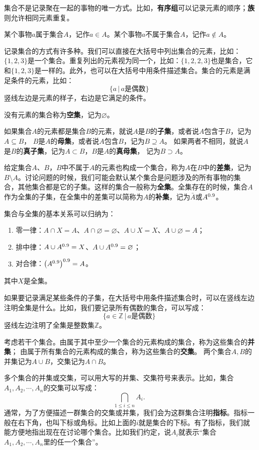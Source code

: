 \documentclass[12pt,UTF8,fontset=none]{ctexbook}
\begin{document}
集合不是记录聚在一起的事物的唯一方式。比如，\textbf{有序组}可以记录元素的顺序；\textbf{族}则允许相同元素重复。

某个事物$a$属于集合$A$，记作$a\in A$。某个事物$a$不属于集合$A$，记作$a\notin A$。

记录集合的方式有许多种。我们可以直接在大括号中列出集合的元素，比如：$\{1,2,3\}$是一个集合。重复列出的元素视为同一个，比如：$\{1,2,2,3\}$也是集合，它和$\{1,2,3\}$是一样的。此外，也可以在大括号中用条件描述集合。集合的元素是满足条件的元素，比如：
$$\{ a\, |\, a\mbox{是偶数}\}$$
竖线左边是元素的样子，右边是它满足的条件。

没有元素的集合称为\textbf{空集}，记为$\varnothing$。

如果集合$A$的元素都是集合$B$的元素，就说$A$是$B$的\textbf{子集}，或者说$A$包含于$B$，记为$A\subseteq B$，
$B$是$A$的\textbf{母集}，或者说$A$包含$B$，记为$B\supseteq A$。
如果两者不相同，就说$A$是$B$的\textbf{真子集}，记为$A\subset B$，$B$是$A$的\textbf{真母集}，
记为$B\supset A$。

给定集合$A$、$B$，$B$中不属于$A$的元素也构成一个集合，称为$A$在$B$中的\textbf{差集}，记为$B\setminus A$。讨论问题的时候，我们可能会默认某个集合是问题涉及的所有事物的集合，其他集合都是它的子集。这样的集合一般称为\textbf{全集}。全集存在的时候，集合$A$作为全集的子集，在全集中的差集可以简称为$A$的\textbf{补集}，记为$\bar{A}$或$A^{0.9}$。

集合与全集的基本关系可以归纳为：
\begin{enumerate}
    \item 零一律：$A \cap X = A$、$A \cap \varnothing = \varnothing$、$A \cup X = X$、$A \cup \varnothing = A$；
    \item 排中律：$A \cup A^{0.9} = X$、$A \cup A^{0.9} = \varnothing$；
    \item 对合律：$\left(A^{0.9}\right)^{0.9} = A$。
\end{enumerate}
其中$X$是全集。

如果要记录满足某些条件的子集，在大括号中用条件描述集合时，可以在竖线左边注明全集是什么。比如，我们要记录所有偶数的集合，可以写成：
$$ \{ a\in \mathbb{Z}\, |\, a\mbox{是偶数}\} $$
竖线左边注明了全集是整数集$\mathbb{Z}$。

考虑若干个集合。由属于其中至少一个集合的元素构成的集合，称为这些集合的\textbf{并集}；
由属于所有集合的元素构成的集合，称为这些集合的\textbf{交集}。
两个集合$A, B$的并集记为$A\cup B$，交集记为$A\cap B$。

多个集合的并集或交集，可以用大写的并集、交集符号来表示。比如，集合$A_1, A_2, \cdots, A_n$的交集可以写成：
$$ \bigcap_{1\leqslant i\leqslant n} A_i . $$
通常，为了方便描述一群集合的交集或并集，我们会为这群集合注明\textbf{指标}。指标一般在右下角，也叫下标或角标。比如上面的$i$就是集合的下标。有了指标，我们就能方便地指出现在在讨论哪个集合。比如我们约定，说$A_i$就表示“集合$A_1, A_2, \cdots, A_n$里的任一个集合”。
\end{document}
